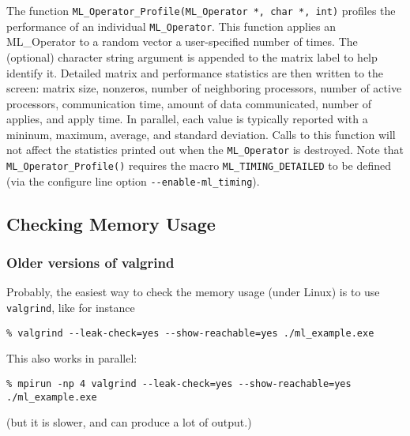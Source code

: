 \documentclass[10pt,letter,relax]{SANDreport}
\begin{document}
The function
\verb!ML_Operator_Profile(ML_Operator *, char *, int)!
profiles the performance of an individual \verb!ML_Operator!.
This function applies an ML\_Operator to a random vector
a user-specified number of times.
The (optional) character string argument is appended to the matrix label to help identify
it.
Detailed matrix and performance statistics are then written to the screen:
matrix size, nonzeros, number of neighboring processors, number of active
processors, communication time, amount of data communicated, number of applies, and apply
time.
In parallel, each value is typically reported with a mininum, maximum, average, and
standard deviation.
Calls to this function will not affect the statistics printed out when the
\verb!ML_Operator! is destroyed.
Note that \verb!ML_Operator_Profile()! requires the macro \verb!ML_TIMING_DETAILED! to be
defined (via the configure line option \verb!--enable-ml_timing!).

\subsection{Checking Memory Usage}

\subsubsection{Older versions of valgrind}
Probably, the easiest way to check the memory usage (under Linux) is to use
\verb!valgrind!, like for instance
\begin{verbatim}
% valgrind --leak-check=yes --show-reachable=yes ./ml_example.exe
\end{verbatim}
This also works in parallel:
\begin{verbatim}
% mpirun -np 4 valgrind --leak-check=yes --show-reachable=yes ./ml_example.exe
\end{verbatim}
(but it is slower, and can produce a lot of output.)
\end{document}
